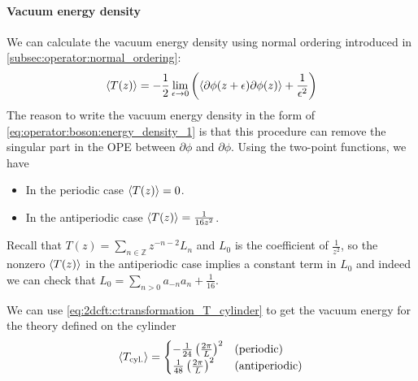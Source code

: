 \documentclass[10pt]{article}
\begin{document}
\paragraph{Vacuum energy density}
We can calculate the vacuum energy density using normal ordering introduced in \cref{subsec:operator:normal_ordering}:
\begin{align}\label{eq:operator:boson:energy_density_1}
    \expval{T(z)}=-\frac{1}{2}\lim_{\epsilon\to0}\left(\expval{\partial\phi(z+\epsilon)\partial\phi(z)}+\frac{1}{\epsilon^2}\right)
\end{align} 
The reason to write the vacuum energy density in the form of \cref{eq:operator:boson:energy_density_1} is that this procedure can remove the singular part in the OPE between $\partial\phi$ and $\partial\phi$.
Using the two-point functions, we have 
\begin{itemize}
    \item In the periodic case $\expval{T(z)}=0$.
    \item In the antiperiodic case $\expval{T(z)}=\frac{1}{16z^2}$.
\end{itemize}
\begin{remark}
    Recall that $T(z)=\sum_{n\in\mathbb{Z}}z^{-n-2}L_n$ and $L_0$ is the coefficient of $\frac{1}{z^2}$, so the nonzero $\expval{T(z)}$ in the antiperiodic case implies a constant term in $L_0$ and indeed we can check that $L_0=\sum_{n>0}a_{-n}a_n+\frac{1}{16}$.
\end{remark}

We can use \cref{eq:2dcft:c:transformation_T_cylinder} to get the vacuum energy for the theory defined on the cylinder 
\begin{align}
    \expval{T_{\text{cyl.}}}=\begin{cases}
        -\frac{1}{24}\left(\frac{2\pi}{L}\right)^2&\text{(periodic)}\\
        \frac{1}{48}\left(\frac{2\pi}{L}\right)^2&\text{(antiperiodic)}
    \end{cases}
\end{align}
\end{document}
